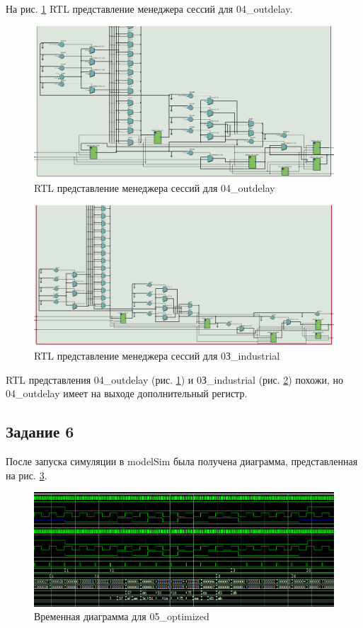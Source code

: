 \documentclass[a4paper,14pt]{article}
\begin{document}
	На рис. \ref{fig:z5rtl} RTL представление менеджера сессий для 04\_outdelay.
	
	\begin{figure}[H]
		\centering
		\includegraphics[width=0.9\linewidth]{images/z5_rtl}
		\caption{RTL представление менеджера сессий для 04\_outdelay}
		\label{fig:z5rtl}
	\end{figure}

	\begin{figure}[H]
		\centering
		\includegraphics[width=0.9\linewidth]{images/9_5}
		\caption{RTL представление менеджера сессий для 0З\_industrial}
		\label{fig:95}
	\end{figure}
	
	RTL представления 04\_outdelay (рис. \ref{fig:z5rtl}) и  0З\_industrial (рис. \ref{fig:95}) похожи, но 04\_outdelay имеет на выходе дополнительный регистр.
	
	\subsection{Задание 6}
	
	После запуска симуляции в modelSim была получена диаграмма, представленная на рис. \ref{fig:z6msimwvf}.
	
	\begin{figure}[H]
		\centering
		\includegraphics[width=0.9\linewidth]{images/z6_msim_wvf}
		\caption{Временная диаграмма для 05\_optimized}
		\label{fig:z6msimwvf}
	\end{figure}
	
\end{document}
